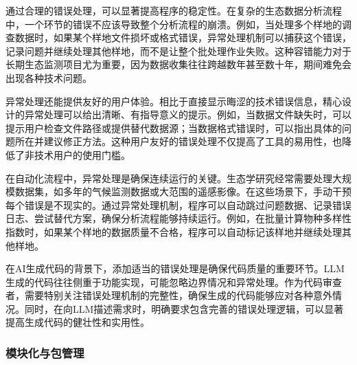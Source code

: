 \documentclass[
]{book}
\begin{document}
通过合理的错误处理，可以显著提高程序的稳定性。在复杂的生态数据分析流程中，一个环节的错误不应该导致整个分析流程的崩溃。例如，当处理多个样地的调查数据时，如果某个样地文件损坏或格式错误，异常处理机制可以捕获这个错误，记录问题并继续处理其他样地，而不是让整个批处理作业失败。这种容错能力对于长期生态监测项目尤为重要，因为数据收集往往跨越数年甚至数十年，期间难免会出现各种技术问题。

异常处理还能提供友好的用户体验。相比于直接显示晦涩的技术错误信息，精心设计的异常处理可以给出清晰、有指导意义的提示。例如，当数据文件缺失时，可以提示用户检查文件路径或提供替代数据源；当数据格式错误时，可以指出具体的问题所在并建议修正方法。这种用户友好的错误处理不仅提高了工具的易用性，也降低了非技术用户的使用门槛。

在自动化流程中，异常处理是确保连续运行的关键。生态学研究经常需要处理大规模数据集，如多年的气候监测数据或大范围的遥感影像。在这些场景下，手动干预每个错误是不现实的。通过异常处理机制，程序可以自动跳过问题数据、记录错误日志、尝试替代方案，确保分析流程能够持续运行。例如，在批量计算物种多样性指数时，如果某个样地的数据质量不合格，程序可以自动标记该样地并继续处理其他样地。

在AI生成代码的背景下，添加适当的错误处理是确保代码质量的重要环节。LLM生成的代码往往侧重于功能实现，可能忽略边界情况和异常处理。作为代码审查者，需要特别关注错误处理机制的完整性，确保生成的代码能够应对各种意外情况。同时，在向LLM描述需求时，明确要求包含完善的错误处理逻辑，可以显著提高生成代码的健壮性和实用性。

\hypertarget{ux6a21ux5757ux5316ux4e0eux5305ux7ba1ux7406}{%
\subsubsection{模块化与包管理}\label{ux6a21ux5757ux5316ux4e0eux5305ux7ba1ux7406}}
\end{document}
